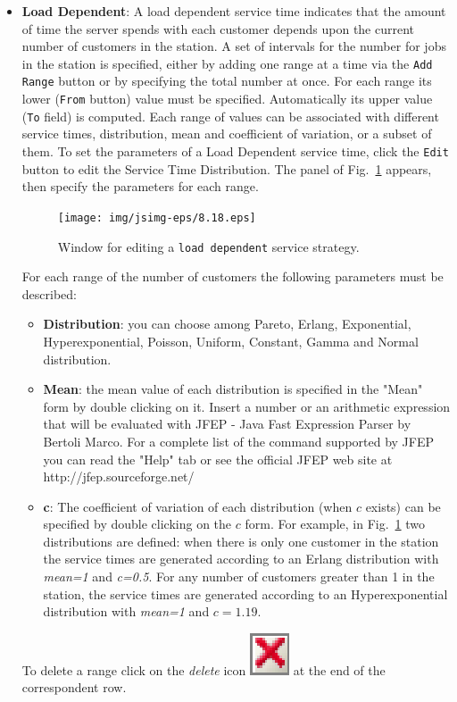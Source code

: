 \begin{itemize}
\item \textbf{Load Dependent}: A load dependent service time
indicates that the amount of time the server spends with each
customer depends upon the current number of customers in the
station. A set of intervals for the number for jobs in the station
is specified, either by adding one range at a time via the
\texttt{Add Range} button or by specifying the total number at
once. For each range its lower (\texttt{From} button) value must
be specified. Automatically its upper value (\texttt{To} field) is
computed. Each range of values can be associated with different
service times, distribution, mean and coefficient of variation, or
a subset of them. To set the parameters of a Load Dependent
service time, click the \texttt{Edit} button to edit the Service
Time Distribution. The panel of Fig.~\ref{fig:ldservstrat}
appears, then specify the parameters for each range.\\
\begin{figure}[htb]
    \begin{center}
        \texttt{[image: img/jsimg-eps/8.18.eps]}
    \end{center}
    \caption{Window for editing a \texttt{load dependent} service strategy.}
    \label{fig:ldservstrat}
\end{figure}
For each range of the number of customers the following parameters
must be described: \begin{itemize} \item \textbf{Distribution}:
you can choose among Pareto, Erlang, Exponential,
Hyperexponential, Poisson, Uniform, Constant, Gamma and Normal
distribution. \item \textbf{Mean}: the mean value of each
distribution is specified in the "Mean" form by double clicking on
it. Insert a number or an arithmetic expression that will be
evaluated with JFEP - Java Fast Expression Parser by Bertoli
Marco. For a complete list of the command supported by JFEP you
can read the "Help" tab or see the official JFEP web site at
http://jfep.sourceforge.net/ \item \textbf{c}: The coefficient of
variation of each distribution (when $c$ exists) can be specified
by double clicking on the $c$ form. For example, in
Fig.~\ref{fig:ldservstrat} two distributions are defined: when there is
only one customer in the station the service times are generated
according to an Erlang distribution with \emph{mean=1} and
\emph{c=0.5}. For any number of customers greater than 1 in the
station, the service times are generated according to an
Hyperexponential distribution with \emph{mean=1} and $c=1.19$.
\end{itemize}
\noindent To delete a range click on the \emph{delete} icon
\includegraphics[scale=.5]{img/jsim/delete.eps}
at the end of the correspondent row.

\end{itemize}

